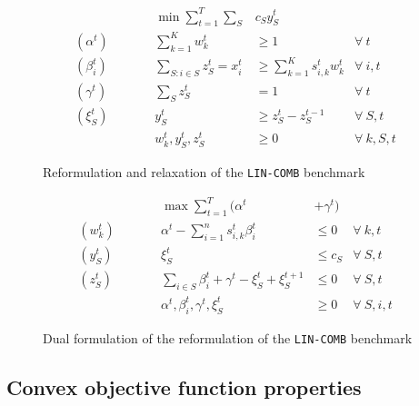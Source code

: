 \begin{figure}[ht]
    \begin{mdframed}
        \begin{align*}
            && \min \sum_{t = 1}^{T} \sum_{S} & c_S y_S^t \\
            (\alpha^{t}) \qquad && \sum_{k=1}^{K} w_{k}^{t} & \geq 1  & \forall\ t \\
            (\beta_{i}^{t}) \qquad && \sum_{S: i \in S} z_{S}^{t} = x_{i}^{t} &\geq \sum_{k=1}^{K} s_{i,k}^{t} w_{k}^{t}   &\forall\ i,t\\
            (\gamma^{t}) \qquad && \sum_{S} z_{S}^{t} &= 1   &\forall\ t\\
            (\xi_{S}^{t}) \qquad && y_{S}^{t} &\geq z_{S}^{t} - z_{S}^{t-1}   &\forall\ S,t\\
            && w_{k}^{t}, y_{S}^{t}, z_{S}^{t} & \ge 0 & \forall\ k,S,t
        \end{align*}
    \end{mdframed}
    \caption{Reformulation and relaxation of the \texttt{LIN-COMB} benchmark}
    \label{fig:reformulation}
\end{figure}

\begin{figure}[ht]
    \begin{mdframed}
        \begin{align*}
            && \max \sum_{t=1}^{T}  (\alpha^{t} &+ \gamma^{t}) \\
            (w_{k}^{t}) \qquad && \alpha^{t} - \sum_{i=1}^{n} s_{i,k}^{t} \beta_{i}^{t}  &\leq 0  &\forall\ k,t\\
            (y_{S}^{t}) \qquad && \xi_{S}^{t}   &\leq c_{S}  &\forall\ S,t \\
            (z_{S}^{t}) \qquad && \sum_{i \in S}\beta_{i}^{t} + \gamma^{t} - \xi_{S}^{t} + \xi_{S}^{t+1}  &\leq 0  &\forall\ S,t \\
            && \alpha^{t}, \beta_{i}^{t}, \gamma^{t}, \xi_{S}^{t} & \ge 0 & \forall\ S,i,t
        \end{align*}
    \end{mdframed}
    \caption{Dual formulation of the reformulation of the \texttt{LIN-COMB} benchmark}
    \label{fig:ref-dual}
\end{figure}

\clearpage

\subsection{Convex objective function properties}

